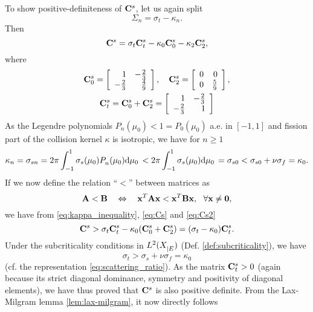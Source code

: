 To show positive-definiteness of $\mat{C}^s$, let us
again split 
$$
	\Sigma_n = \sigma_t - \kappa_n.
$$
Then 
\begin{equation}\label{eq:Cs}
	\mat{C}^s = \sigma_t\mat{C}^s_t - \kappa_0 \mat{C}^s_0 - \kappa_2 \mat{C}^s_2,
\end{equation}
where
\begin{equation}\label{eq:Cs2}
\begin{gathered}
	\mat{C}^s_0 = \left[
\begin{array}{rr}
 1 & -\frac{2}{3} \\
 -\frac{2}{3} & \frac{4}{9} \\
\end{array}
\right],\quad
\mat{C}^s_2 = 
\left[
\begin{array}{rr}
 0 & 0 \\
 0 & \frac{5}{9} \\
\end{array}
\right],\\
\mat{C}^s_t = \mat{C}^s_0 + \mat{C}^s_2 = \left[
\begin{array}{rr}
 1 & -\frac{2}{3} \\
 -\frac{2}{3} & 1 \\
\end{array}
\right]
\end{gathered}
\end{equation}
As the Legendre polynomials $P_n(\mu_0) < 1 = P_0(\mu_0)$ a.e. in $[-1,1]$ and fission part of the collision kernel
$\kappa$ is isotropic, we have for $n \geq 1$
\begin{equation}\label{eq:kappa_inequality}
	\kappa_n = \sigma_{sn} = 2\pi \muint[_0]{\sigma_s(\mu_0)\P{n}{}(\mu_0)} < 2\pi
	\muint[_0]{\sigma_s(\mu_0)} = \sigma_{s0} < \sigma_{s0} + \nu\sigma_f = \kappa_0. 
\end{equation}
If we now define the relation ``$<$'' between matrices as
$$
	\mat{A} < \mat{B}\quad \Leftrightarrow \quad \mat{x}^T \mat{A} \mat{x} < \mat{x}^T \mat{B} \mat{x},\ \ \forall \mat{x}
	\neq \mat{0}, 
$$
we have from \eqref{eq:kappa_inequality}, \eqref{eq:Cs} and \eqref{eq:Cs2}
$$
	\mat{C}^s > \sigma_t\mat{C}^s_t - \kappa_0(\mat{C}^s_0 + \mat{C}^s_2) = (\sigma_t - \kappa_0)\mat{C}^s_t.
$$
Under the subcriticality conditions in $\Lp[2](\XE)$ (Def. \ref{def:subcriticality}), we have 
$$
	\sigma_t > \sigma_s + \nu\sigma_f = \kappa_0
$$
(cf. the representation \eqref{eq:scattering_ratio}). As the matrix $\mat{C}^s_t > 0$ (again because its strict
diagonal dominance, symmetry and positivity of diagonal elements), we have thus proved that $\mat{C}^s$ is also positive
definite. From the Lax-Milgram lemma \ref{lem:lax-milgram}, it now directly follows

